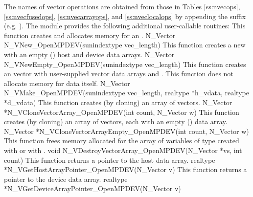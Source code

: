 The names of vector operations are obtained from those in Tables
\ref{ss:nvecops}, \ref{ss:nvecfusedops}, \ref{ss:nvecarrayops}, and
\ref{ss:nveclocalops} by appending the
suffix  (e.g. ). The module
{\nvecopenmpdev} provides the following additional user-callable routines:
{
  This function creates and allocates memory for an {\nvecopenmpdev} .
}
{
  N\_Vector N\_VNew\_OpenMPDEV(sunindextype vec\_length)
}
{
  This function creates a new {\nvecopenmpdev}  with an empty
  () host and device data arrays.
}
{
  N\_Vector N\_VNewEmpty\_OpenMPDEV(sunindextype vec\_length)
}
{
 This function creates an {\nvecopenmpdev} vector with user-supplied vector data
 arrays  and . This function does not allocate memory for
 data itself.
}
{
  N\_Vector N\_VMake\_OpenMPDEV(sunindextype vec\_length, realtype *h\_vdata,
  realtype *d\_vdata)
}
{
 This function creates (by cloning) an array of  {\nvecopenmpdev} vectors.
}
{
 N\_Vector *N\_VCloneVectorArray\_OpenMPDEV(int count, N\_Vector w)
}
{
 This function creates (by cloning) an array of  {\nvecopenmpdev} vectors, each with an
 empty () data array.
}
{
 N\_Vector *N\_VCloneVectorArrayEmpty\_OpenMPDEV(int count, N\_Vector w)
}
{
 This function frees memory allocated for the array of  variables of type
  created with  or with \newline
 .
}
{
 void N\_VDestroyVectorArray\_OpenMPDEV(N\_Vector *vs, int count)
}
{
 This function returns a pointer to the host data array.
}
{
 realtype *N\_VGetHostArrayPointer\_OpenMPDEV(N\_Vector v)
}
{
 This function returns a pointer to the device data array.
}
{
 realtype *N\_VGetDeviceArrayPointer\_OpenMPDEV(N\_Vector v)
}
